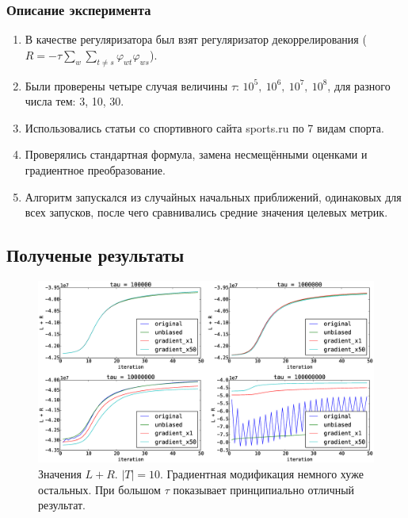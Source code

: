 \documentclass[utf8]{beamer}
\renewcommand{\phi}{\varphi}
\begin{document}
\begin{frame}
\frametitle{Описание эксперимента}
		
\begin{enumerate}
\item В качестве регуляризатора был взят регуляризатор декоррелирования ($R = -\tau\sum\limits_w \sum\limits_{t \neq s} \phi_{wt} \phi_{ws}$).
\item Были проверены четыре случая величины $\tau$: $10^5,~10^6,~10^7,~10^8$, для разного числа тем: 3, 10, 30.
\item Использовались статьи со спортивного сайта sports.ru по 7 видам спорта.
\item Проверялись стандартная формула, замена несмещёнными оценками и градиентное преобразование.
\item Алгоритм  запускался из случайных начальных приближений, одинаковых для всех запусков, после чего сравнивались средние значения целевых метрик.
\end{enumerate}
\end{frame}

\subsection{Полученые результаты}
\captionsetup{labelformat=simple} 
\begin{frame}
\begin{figure}[h]
	\centering  	
	\caption{Значения $L + R$. $|T| = 10$. Градиентная модификация немного хуже остальных. При большом $\tau$ показывает принципиально отличный результат.} 
	\medskip
	\includegraphics[width=0.9\linewidth]{presentation_pictures/topics_10_LR_values.eps}  
\end{figure}
\end{frame}
\end{document}

